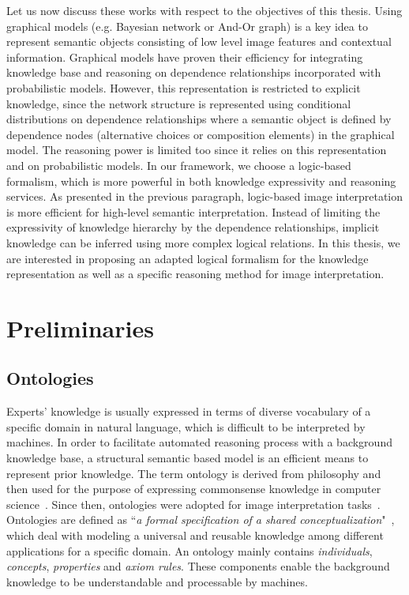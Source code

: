 \documentclass{article}
\begin{document}
Let us now discuss these works with respect to the objectives of this thesis.
Using graphical models (e.g. Bayesian network or And-Or graph) is a key idea to represent semantic objects consisting of low level image features and contextual information. 
Graphical models have proven their efficiency for integrating knowledge base and reasoning on dependence relationships incorporated with probabilistic models.
However, this representation is restricted to explicit knowledge, since the network structure is represented using conditional distributions on dependence relationships 
where a semantic object is defined by dependence nodes (alternative choices or composition elements) in the graphical model.
The reasoning power is limited too since it relies on this representation and on probabilistic models.
In our framework, we choose a logic-based formalism, which is more powerful in both knowledge expressivity and reasoning services.
As presented in the previous paragraph, logic-based image interpretation is more efficient for high-level semantic interpretation.
Instead of limiting the expressivity of knowledge hierarchy by the dependence relationships, implicit knowledge can be inferred using more complex logical relations.
In this thesis, we are interested in proposing an adapted logical formalism for the knowledge representation as well as a specific reasoning method for image interpretation.
\section{Preliminaries}\label{sec:pre}
\subsection{Ontologies}
Experts' knowledge is usually expressed in terms of diverse vocabulary of a specific domain in natural language, which is difficult to be interpreted by machines.
In order to facilitate automated reasoning process with a background knowledge base, a structural semantic based model is  an efficient means to represent prior knowledge.
The term ontology is derived from philosophy and then used for the purpose of expressing commonsense knowledge in computer science~\cite{alexander1986knowledge}.
Since then, ontologies were adopted for image interpretation tasks~\cite{bannour2011towards,Hudelot2008fuzzy,town2006ontological}.
Ontologies are defined as “\textit{a formal specification of a shared conceptualization}"~\cite{studer1998knowledge},
which deal with modeling a universal and reusable knowledge among different applications for a specific domain.
An ontology mainly contains  \textit{individuals}, \textit{concepts}, \textit{properties} and \textit{axiom rules}. 
These components enable the background knowledge to be understandable and processable by machines.
\end{document}
